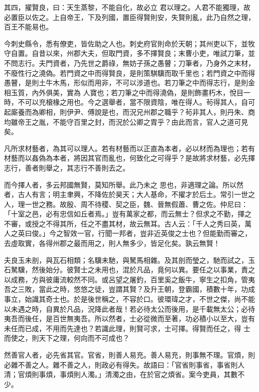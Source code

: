 \begin{pinyinscope}
 其四，擢賢良，曰：天生蒸黎，不能自化，故必立
 君以理之。人君不能獨理，故必置臣以佐之。上自帝王，下及列國，置臣得賢則安，失賢則亂，此乃自然之理，百王不能易也。



 今刺史縣令，悉有僚吏，皆佐助之人也。刺史府官則命於天朝；其州吏以下，並牧守自置。自昔以來，州郡大夫，但取門資，多不擇賢良；末曹小吏，唯試刀筆，並不問志行。夫門資者，乃先世之爵祿，無妨子孫之愚瞽；刀筆者，乃身外之末材，不廢性行之澆偽。若門資之中而得賢良，是則策騏驥而取千里也；若門資之中而得愚瞽，是則土牛木馬，形似而用非，不可以涉道也。若刀筆之中而得志行，是則金相玉質，內外俱美，實為
 人寶也；若刀筆之中而得澆偽，是則飾畫朽木，悅目一時，不可以充榱椽之用也。今之選舉者，當不限資陰，唯在得人。茍得其人，自可起廝養而為卿相，則伊尹、傅說是也，而況兄州郡之職乎？茍非其人，則丹朱、商均雖帝王之胤，不能守百里之封，而況於公卿之胄乎？由此而言，官人之道可見矣。



 凡所求材藝者，為其可以理人。若有材藝而以正直為本者，必以材而為理也；若有材藝而以姦偽為本者，將因其官而亂也，何致化之可得乎？是故將求材藝，必先擇志行，善者則舉之，其志行不善則去之。



 而今擇人者，多云邦國無賢，莫知所舉。此乃未之
 思也，非適理之論。所以然者，古人有言；明主聿興，不降佐於昊天；大人基命，不擢才於后土。常引一世之人，理一世之務。故殷、周不待稷、契之臣，魏、晉無假蕭、曹之佐。仲尼曰：「十室之邑，必有忠信如丘者焉。」豈有萬家之都，而云無士？但求之不勤，擇之不審，或授之不得其所，任之不盡其材，故云無耳。古人云：「千人之秀曰英，萬人之英曰俊。」今之智效一官，行聞一邦者，豈非近英俊之士也？但能勤而審之，去虛取實，各得州郡之最而用之，則人無多少，皆足化矣。孰云無賢！



 夫良玉未剖，與瓦石相類；名驥未馳，與駑馬相雜。及其剖而瑩之，馳而試之，玉
 石駑驥，然後始分。彼賢士之未用也，混於凡品，竟何以異。要任之以事業，責之以成務，方與彼庸流較然不同。或呂望之屠釣，百里奚之飯牛，寧生之扣角，管夷吾之三敗，當此之時，悠悠之徒，豈謂其賢？及升王朝，登霸國，積數十年，功成事立，始識其奇士也。於是後世稱之，不容於口。彼環瑋之才，不世之傑，尚不能以未遇之時，自異於凡品，況降此者哉！若必待太公而後用，是千載無太公；必待夷吾而後任，是百世無夷吾。所以然者，士必從微而至著，功必積小以至大，豈有未任而已成，不用而先達也？若識此理，則賢可求，士可擇。得賢而任之，得
 士而使之，則天下之理，何向而不可成也？



 然善官人者，必先省其官。官省，則善人易充。善人易充，則事無不理。官煩，則必雜不善之人。雜不善之人，則政必有得失。故語曰：「官省則事省，事省則人清；官煩則事煩，事煩則人濁。」清濁之由，在於官之煩省。案今吏員，其數不少。




\end{pinyinscope}
